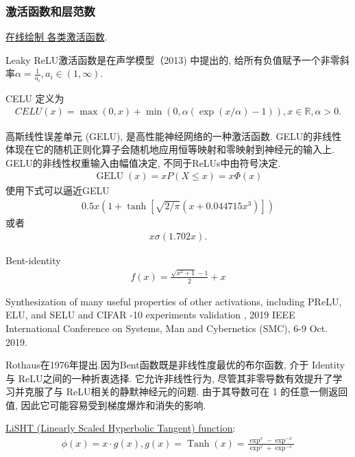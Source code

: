 \subsubsection{激活函数和层范数}
\href{https://dashee87.github.io/deep\%20learning/visualising-activation-functions-in-neural-networks/}{在线绘制 各类激活函数}.
\begin{remark}
Leaky ReLU激活函数是在声学模型（2013) 中提出的, 给所有负值赋予一个非零斜率$\alpha=\frac 1 {a_i}, a_i\in (1,\infty)$.
\end{remark}
\begin{remark}
    CELU \cite{hendrycks2016gelu} 定义为
\begin{align}
 CELU(x)=\max(0,x)+\min(0,\alpha(\exp(x/\alpha)-1)), x\in \mathbb R, \alpha> 0.
\end{align}
\end{remark}
\begin{remark}
    高斯线性误差单元 (GELU), 是高性能神经网络的一种激活函数. GELU的非线性体现在它的随机正则化算子会随机地应用恒等映射和零映射到神经元的输入上.
GELU的非线性权重输入由幅值决定, 不同于ReLUs中由符号决定.
\begin{align}
  \operatorname{GELU}(x)=x P(X \leq x)=x \Phi(x)
\end{align}
使用下式可以逼近GELU
\begin{align}
  0.5 x\left(1+\tanh \left[\sqrt{2 / \pi}\left(x+0.044715 x^{3}\right)\right]\right)
\end{align}
或者
\begin{align}
    x \sigma(1.702 x).
\end{align}
\end{remark}

Bent-identity 
\begin{align}
    f(x) = \frac{\sqrt{x^2 + 1} - 1}{2} +x
\end{align}

Synthesization of many useful properties of other activations, including PReLU, ELU, and SELU and CIFAR -10 experiments  validation \cite{Godfrey2019-9846}, 2019 IEEE International Conference on Systems, Man and Cybernetics (SMC), 6-9 Oct. 2019.

Rothaus在1976年提出.因为Bent函数既是非线性度最优的布尔函数, 介于 Identity 与 ReLU之间的一种折衷选择. 它允许非线性行为, 尽管其非零导数有效提升了学习并克服了与 ReLU相关的静默神经元的问题.
由于其导数可在 1 的任意一侧返回值, 因此它可能容易受到梯度爆炸和消失的影响.

\href{https://arxiv.org/pdf/1901.05894.pdf}{LiSHT (Linearly Scaled Hyperbolic Tangent) function}:
\begin{align}
    \phi(x)=x \cdot g(x), g(x)=\operatorname{Tanh}(x)=\frac{\exp ^{x}-\exp ^{-x}}{\exp ^{x}+\exp ^{-x}}
\end{align}

